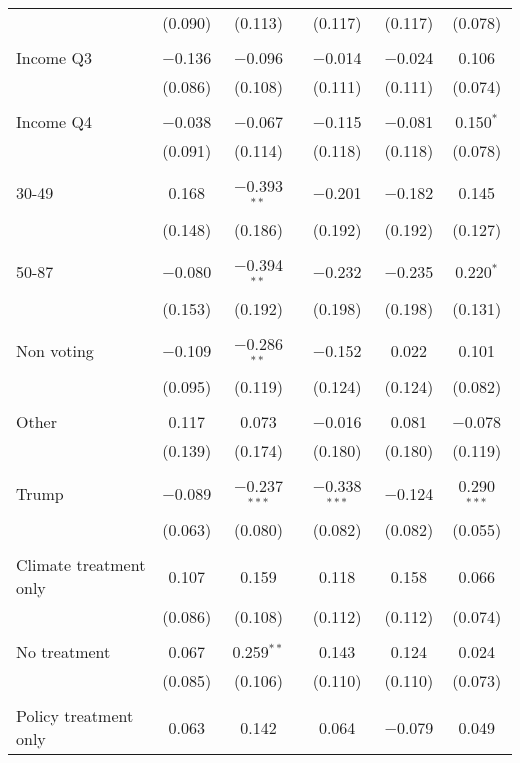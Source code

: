 \begin{tabular}{@{\extracolsep{5pt}}lccccc}
  & (0.090) & (0.113) & (0.117) & (0.117) & (0.078) \\ 
  & & & & & \\ 
 Income Q3 & $-$0.136 & $-$0.096 & $-$0.014 & $-$0.024 & 0.106 \\ 
  & (0.086) & (0.108) & (0.111) & (0.111) & (0.074) \\ 
  & & & & & \\ 
 Income Q4 & $-$0.038 & $-$0.067 & $-$0.115 & $-$0.081 & 0.150$^{*}$ \\ 
  & (0.091) & (0.114) & (0.118) & (0.118) & (0.078) \\ 
  & & & & & \\ 
 30-49 & 0.168 & $-$0.393$^{**}$ & $-$0.201 & $-$0.182 & 0.145 \\ 
  & (0.148) & (0.186) & (0.192) & (0.192) & (0.127) \\ 
  & & & & & \\ 
 50-87 & $-$0.080 & $-$0.394$^{**}$ & $-$0.232 & $-$0.235 & 0.220$^{*}$ \\ 
  & (0.153) & (0.192) & (0.198) & (0.198) & (0.131) \\ 
  & & & & & \\ 
 Non voting & $-$0.109 & $-$0.286$^{**}$ & $-$0.152 & 0.022 & 0.101 \\ 
  & (0.095) & (0.119) & (0.124) & (0.124) & (0.082) \\ 
  & & & & & \\ 
 Other & 0.117 & 0.073 & $-$0.016 & 0.081 & $-$0.078 \\ 
  & (0.139) & (0.174) & (0.180) & (0.180) & (0.119) \\ 
  & & & & & \\ 
 Trump & $-$0.089 & $-$0.237$^{***}$ & $-$0.338$^{***}$ & $-$0.124 & 0.290$^{***}$ \\ 
  & (0.063) & (0.080) & (0.082) & (0.082) & (0.055) \\ 
  & & & & & \\ 
 Climate treatment only & 0.107 & 0.159 & 0.118 & 0.158 & 0.066 \\ 
  & (0.086) & (0.108) & (0.112) & (0.112) & (0.074) \\ 
  & & & & & \\ 
 No treatment & 0.067 & 0.259$^{**}$ & 0.143 & 0.124 & 0.024 \\ 
  & (0.085) & (0.106) & (0.110) & (0.110) & (0.073) \\ 
  & & & & & \\ 
 Policy treatment only & 0.063 & 0.142 & 0.064 & $-$0.079 & 0.049 \\ 

\end{tabular}
